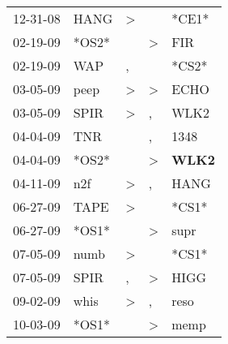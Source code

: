 \begin{supertabular}{p{0.07\textwidth}p{0.06\textwidth}p{0.02\textwidth}p{0.02\textwidth}p{0.06\textwidth}}
          12-31-08\textsuperscript{} &           HANG\textsuperscript{} &     \textgreater &                  &                            *CE1* \\
          02-19-09\textsuperscript{} &                            *OS2* &                  &     \textgreater &            FIR\textsuperscript{} \\
          02-19-09\textsuperscript{} &            WAP\textsuperscript{} &                , &                  &                            *CS2* \\
          03-05-09\textsuperscript{} &           peep\textsuperscript{} &     \textgreater &     \textgreater &           ECHO\textsuperscript{} \\
          03-05-09\textsuperscript{} &           SPIR\textsuperscript{} &     \textgreater &                , &           WLK2\textsuperscript{} \\
          04-04-09\textsuperscript{} &            TNR\textsuperscript{} &                  &                , &           1348\textsuperscript{} \\
          04-04-09\textsuperscript{} &                            *OS2* &                  &     \textgreater &  \textbf{WLK2\textsuperscript{}} \\
          04-11-09\textsuperscript{} &            n2f\textsuperscript{} &     \textgreater &                , &           HANG\textsuperscript{} \\
          06-27-09\textsuperscript{} &           TAPE\textsuperscript{} &     \textgreater &                  &                            *CS1* \\
          06-27-09\textsuperscript{} &                            *OS1* &                  &     \textgreater &           supr\textsuperscript{} \\
          07-05-09\textsuperscript{} &           numb\textsuperscript{} &     \textgreater &                  &                            *CS1* \\
          07-05-09\textsuperscript{} &           SPIR\textsuperscript{} &                , &     \textgreater &           HIGG\textsuperscript{} \\
          09-02-09\textsuperscript{} &           whis\textsuperscript{} &     \textgreater &                , &           reso\textsuperscript{} \\
          10-03-09\textsuperscript{} &                            *OS1* &                  &     \textgreater &           memp\textsuperscript{} \\

\end{supertabular}
